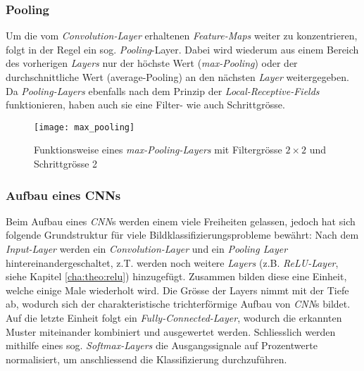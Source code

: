 \subsubsection{Pooling}
Um die vom \textit{Convolution-Layer} erhaltenen \textit{Feature-Maps} weiter zu konzentrieren, folgt in der Regel ein sog. \textit{Pooling}-Layer. Dabei wird wiederum aus einem Bereich des vorherigen \textit{Layers} nur der höchste Wert (\textit{max-Pooling}) oder der durchschnittliche Wert (average-Pooling) an den nächsten \textit{Layer} weitergegeben. Da \textit{Pooling-Layers} ebenfalls nach dem Prinzip der \textit{Local-Receptive-Fields} funktionieren, haben auch sie eine Filter- wie auch Schrittgrösse.

\begin{figure}[h]
	\centering
	\texttt{[image: max\_pooling]}
	\caption[\textit{\textit{max-Pooling-Layer}}]{Funktionsweise eines \textit{max-Pooling-Layers} mit Filtergrösse $2\times 2$ und Schrittgrösse 2}
	\label{img:max_pooling}
\end{figure}


\subsubsection{Aufbau eines CNNs}

Beim Aufbau eines \textit{CNN}s werden einem viele Freiheiten gelassen, jedoch hat sich folgende Grundstruktur für viele Bildklassifizierungsprobleme bewährt: Nach dem \textit{Input-Layer} werden ein \textit{Convolution-Layer} und ein \textit{Pooling Layer} hintereinandergeschaltet, z.T. werden noch weitere \textit{Layers} (z.B. \textit{ReLU-Layer}, siehe Kapitel \ref{cha:theo:relu}) hinzugefügt. Zusammen bilden diese eine Einheit, welche einige Male wiederholt wird. Die Grösse der Layers nimmt mit der Tiefe ab, wodurch sich der charakteristische trichterförmige Aufbau von \textit{CNN}s bildet. Auf die letzte Einheit folgt ein \textit{Fully-Connected-Layer}, wodurch die erkannten Muster miteinander kombiniert und ausgewertet werden. Schliesslich werden mithilfe eines sog. \textit{Softmax-Layers} die Ausgangssignale auf Prozentwerte normalisiert, um anschliessend die Klassifizierung durchzuführen.



